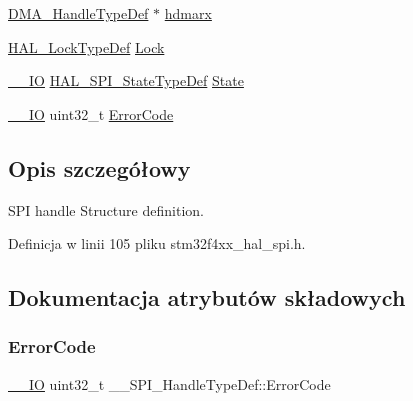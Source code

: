 \begin{DoxyCompactItemize}
\hyperlink{group___d_m_a___exported___types_ga41b754a906b86bce54dc79938970138b}{D\+M\+A\+\_\+\+Handle\+Type\+Def} $\ast$ \hyperlink{struct_____s_p_i___handle_type_def_a0876a1b344524bbdbd984be1c3b07a10}{hdmarx}
\item 
\hyperlink{stm32f4xx__hal__def_8h_ab367482e943333a1299294eadaad284b}{H\+A\+L\+\_\+\+Lock\+Type\+Def} \hyperlink{struct_____s_p_i___handle_type_def_aa13d993a0b9b0ea6a07e5a77eeaf394e}{Lock}
\item 
\hyperlink{core__sc300_8h_aec43007d9998a0a0e01faede4133d6be}{\+\_\+\+\_\+\+IO} \hyperlink{group___s_p_i___exported___types_ga8891cb64e76198a860172d94c638c9b4}{H\+A\+L\+\_\+\+S\+P\+I\+\_\+\+State\+Type\+Def} \hyperlink{struct_____s_p_i___handle_type_def_aa3e13040cc9ea19050d21818bccd49c9}{State}
\item 
\hyperlink{core__sc300_8h_aec43007d9998a0a0e01faede4133d6be}{\+\_\+\+\_\+\+IO} uint32\+\_\+t \hyperlink{struct_____s_p_i___handle_type_def_ab2497f2e3cfae59376db75da3bda7ffe}{Error\+Code}
\end{DoxyCompactItemize}


\subsection{Opis szczegółowy}
S\+PI handle Structure definition. 

Definicja w linii 105 pliku stm32f4xx\+\_\+hal\+\_\+spi.\+h.



\subsection{Dokumentacja atrybutów składowych}
\mbox{\label{struct_____s_p_i___handle_type_def_ab2497f2e3cfae59376db75da3bda7ffe}} 
\subsubsection{\texorpdfstring{Error\+Code}{ErrorCode}}
{\footnotesize\ttfamily \hyperlink{core__sc300_8h_aec43007d9998a0a0e01faede4133d6be}{\+\_\+\+\_\+\+IO} uint32\+\_\+t \+\_\+\+\_\+\+S\+P\+I\+\_\+\+Handle\+Type\+Def\+::\+Error\+Code}

